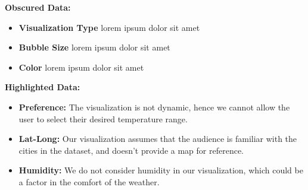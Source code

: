 \documentclass{article}
\begin{document}
\textbf{Obscured Data:}
\begin{itemize}
    \item \textbf{Visualization Type} lorem ipsum dolor sit amet  
    \item \textbf{Bubble Size} lorem ipsum dolor sit amet
    \item \textbf{Color} lorem ipsum dolor sit amet
\end{itemize}

\textbf{Highlighted Data:}
\begin{itemize}
    \item \textbf{Preference:} The visualization is not dynamic, hence we cannot allow the user to select their desired temperature range.
    \item \textbf{Lat-Long:} Our visualization assumes that the audience is familiar with the cities in the dataset, and doesn't provide a map for reference.
    \item \textbf{Humidity:} We do not consider humidity in our visualization, which could be a factor in the comfort of the weather.
\end{itemize}



\end{document}
